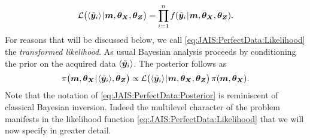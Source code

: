 \begin{equation} \label{eq:JAIS:PerfectData:Likelihood}
  \mathcal{L} \big( \langle{\tilde{\bm{y}}_i}\rangle {\:\!}|{\:\!} \bm{m},\bm{\theta}_{\bm{X}},\bm{\theta}_{\bm{Z}} \big)
  = \prod\limits_{i=1}^n f(\tilde{\bm{y}}_i {\:\!}|{\:\!} \bm{m},\bm{\theta}_{\bm{X}},\bm{\theta}_{\bm{Z}}).
\end{equation}
For reasons that will be discussed below, we call \cref{eq:JAIS:PerfectData:Likelihood} the \textit{transformed likelihood}.
As usual Bayesian analysis proceeds by conditioning the prior on the acquired data \(\langle{\tilde{\bm{y}}_i}\rangle\).
The posterior follows as
\begin{equation} \label{eq:JAIS:PerfectData:Posterior}
  \pi \big( \bm{m},\bm{\theta}_{\bm{X}} {\:\!}|{\:\!} \langle{\tilde{\bm{y}}_i}\rangle,\bm{\theta}_{\bm{Z}} \big)
  \propto \mathcal{L} \big( \langle{\tilde{\bm{y}}_i}\rangle {\:\!}|{\:\!} \bm{m},\bm{\theta}_{\bm{X}}, \bm{\theta}_{\bm{Z}} \big) \, \pi(\bm{m},\bm{\theta}_{\bm{X}}).
\end{equation}
Note that the notation of \cref{eq:JAIS:PerfectData:Posterior} is reminiscent of classical Bayesian inversion.
Indeed the multilevel character of the problem manifests in the likelihood function \cref{eq:JAIS:PerfectData:Likelihood} that we will now specify in greater detail.

